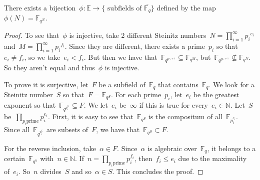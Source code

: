 \begin{theorem}
  There exists a bijection~$\phi\colon \mathbb{E} \rightarrow \{\text{ subfields of } \overline{\mathbb{F}_q} \}$ defined by the map~$\phi(N) = \mathbb{F}_{q^N}$.
  \begin{proof}
    To see that~$\phi$ is injective, take 2 different Steinitz numbers~$N=\prod_{i=1}^\infty {p_i}^{e_{i}}$ and~$M=\prod_{i=1}^\infty {p_i}^{f_{i}}$. Since they are different, there exists a prime~$p_i$ so that~$e_i \neq f_i$, so we take~$e_i < f_i$. But then we have that~$\mathbb{F}_{q^{p^{e_i+1}}} \subseteq \mathbb{F}_{q^M}$, but~$\mathbb{F}_{q^{p^{e_i+1}}} \nsubseteq \mathbb{F}_{q^N}$. So they aren't equal and thus~$\phi$ is injective.

    To prove it is surjective, let~$F$ be a subfield of~$\overline{\mathbb{F}_{q}}$ that contains~$\mathbb{F}_q$. We look for a Steinitz number~$S$ so that~$F = \mathbb{F}_{q^S}$. For each prime~$p_i$, let~$e_i$ be the greatest exponent so that~$\mathbb{F}_{q^{p_i^{e_i}}} \subseteq F$. We let~$e_i$ be~$\infty$ if this is true for every~$e_i \in \mathbb{N}$. Let~$S$ be~$\prod_{p_i \text{prime}} p_i^{e_i}$. First, it is easy to see that~$\mathbb{F}_{q^S}$ is the compositum of all~$\mathbb{F}_{p_i^{e_i}}$. Since all~$\mathbb{F}_{q^{p_i^{e_i}}}$ are subsets of~$F$, we have that~$\mathbb{F}_{q^S} \subset F$.
    
    For the reverse inclusion, take~$\alpha \in F$. Since~$\alpha$ is algebraic over~$\mathbb{F}_q$, it belongs to a certain~$\mathbb{F}_{q^n}$ with~$n \in \mathbb{N}$. If~$n = \prod_{p_i \text{prime}} p_i^{f_i}$, then~$f_i \leq e_i$ due to the maximality of~$e_i$. So~$n$ divides~$S$ and so~$\alpha \in S$. This concludes the proof.
  \end{proof}
\end{theorem}


